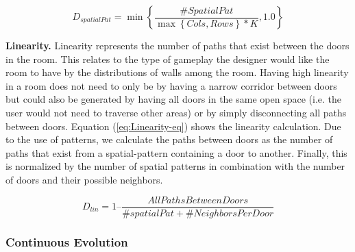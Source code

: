 


\begin{equation} 
\label{eq:spatial-pat-eq}
D_{spatialPat} = \min\left\{\frac{\#SpatialPat}{\max\left\{{Cols, Rows}\right\} * \textit{K}}, 1.0\right\}
\end{equation}

\textbf{Linearity.} Linearity represents the number of paths that exist between the doors in the room. This relates to the type of gameplay the designer would like the room to have by the distributions of walls among the room. Having high linearity in a room does not need to only be by having a narrow corridor between doors but could also be generated by having all doors in the same open space (i.e. the user would not need to traverse other areas) or by simply disconnecting all paths between doors. Equation (\ref{eq:Linearity-eq}) shows the linearity calculation. Due to the use of patterns, we calculate the paths between doors as the number of paths that exist from a spatial-pattern containing a door to another. Finally, this is normalized by the number of spatial patterns in combination with the number of doors and their possible neighbors.

\begin{equation} \label{eq:Linearity-eq}
D_{lin} = 1 \text{--} \frac{AllPathsBetweenDoors} {\#spatialPat + \#NeighborsPerDoor}
\end{equation}

\subsubsection{Continuous Evolution}


